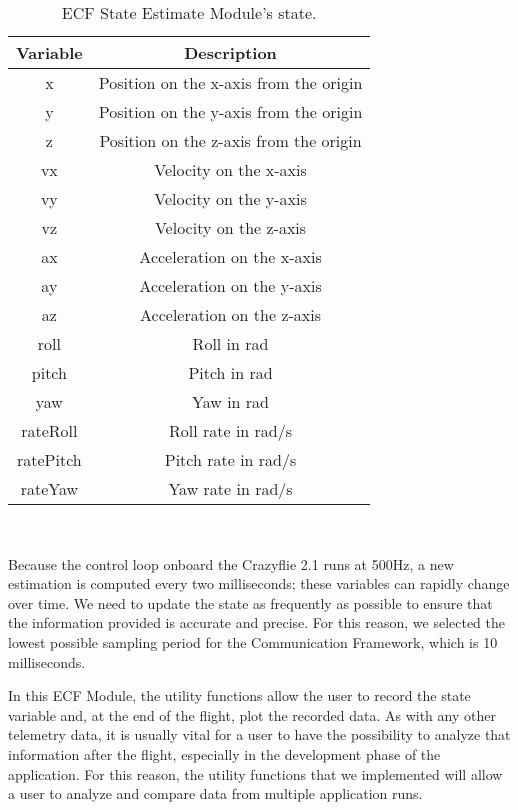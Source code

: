 \begin{table}[tb]
    \centering
    \begin{tabular}{*{2}{|c}|}
    \hline
    \textbf{Variable} & \textbf{Description} \\
    \hline \hline
    x & Position on the x-axis from the origin \\
    \hline
    y & Position on the y-axis from the origin \\
    \hline
    z & Position on the z-axis from the origin \\
    \hline\hline
    vx & Velocity on the x-axis \\
    \hline
    vy & Velocity on the y-axis \\
    \hline
    vz & Velocity on the z-axis \\
    \hline\hline
    ax & Acceleration on the x-axis \\
    \hline
    ay & Acceleration on the y-axis \\
    \hline
    az & Acceleration on the z-axis \\
    \hline\hline
    roll & Roll in rad \\
    \hline
    pitch & Pitch in rad \\
    \hline
    yaw & Yaw in rad \\
    \hline\hline
    rateRoll & Roll rate in rad/s \\
    \hline
    ratePitch & Pitch rate in rad/s \\
    \hline
    rateYaw & Yaw rate in rad/s \\
    \hline
    \end{tabular}
    \\[10pt]
    \caption{ECF State Estimate Module's state.}\label{table:estimate_module_state}
\end{table}

Because the control loop onboard the Crazyflie 2.1 runs at 500Hz, a new estimation is computed every two milliseconds; these variables can rapidly change over time. 
We need to update the state as frequently as possible to ensure that the information provided is accurate and precise. 
For this reason, we selected the lowest possible sampling period for the Communication Framework, which is 10 milliseconds.

In this ECF Module, the utility functions allow the user to record the state variable and, at the end of the flight, plot the recorded data.
As with any other telemetry data, it is usually vital for a user to have the possibility to analyze that information after the flight, especially in the development phase of the application.
For this reason, the utility functions that we implemented will allow a user to analyze and compare data from multiple application runs.

